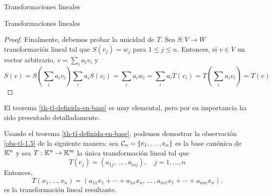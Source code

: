 \begin{chapter}{Transformaciones lineales}
\begin{section}{Transformaciones lineales}
\begin{proof}
                Finalmente,  debemos probar la unicidad de $T$. Sea $S: V \to W$ transformación lineal tal que $S(v_j) = w_j$ para $1 \le j \le n$. Entonces,  si $v \in V$ un vector arbitrario, $v = \sum_i a_i v_i$ y
                \begin{equation*}
                    S(v) = S(\sum_i a_i v_i)\sum_i a_i S( v_i) = \sum_i a_iw_i = 
                     \sum_i a_i T( v_i) =  T(\sum_i a_i v_i) = T(v)
                \end{equation*}
            \end{proof}
        
        El teorema \ref{th-tl-definida-en-base} es muy elemental, pero por su importancia ha sido presentado
        detalladamente. 
        
            \begin{ejemplo*} Usando el teorema \ref{th-tl-definida-en-base}, podemos demostrar la observación \ref{obs-tl-1.5} de la siguiente manera: sea  $\mathcal{C}_n = \{e_1,\ldots,e_n\}$ es la base canónica de $\mathbb K^n$ y  sea  $T: \mathbb K^n \to \mathbb K^m$ la única transformación lineal tal que 
            \begin{equation*}
            T(e_j)  = (a_{1j},\, \ldots\,,a_{mj} ), \quad j=1,\ldots,n
            \end{equation*}	
            Entonces, 
            \begin{equation*}
            T(x_1,\ldots,x_n) = (a_{11}x_1+\cdots + a_{1n}x_n,\, \ldots\,,a_{m1}x_1+\cdots + a_{mn}x_n ).
            \end{equation*}
            es la transformación lineal resultante.
        \end{ejemplo*}
        

\end{section}
\end{chapter}
